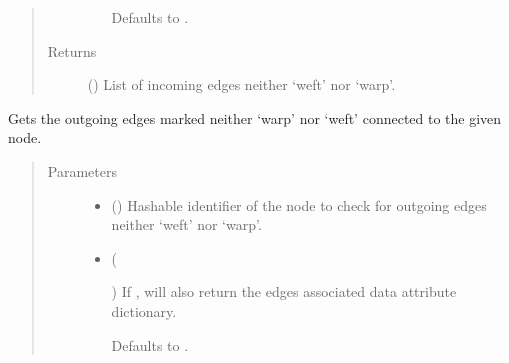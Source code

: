 \documentclass[letterpaper,10pt,english]{sphinxmanual}
\begin{document}
\begin{fulllineitems}
\begin{fulllineitems}
\begin{quote}
\begin{description}
\begin{itemize}
Defaults to .


\end{itemize}

\item[{Returns}] \leavevmode
{} () \textendash{} List of incoming edges neither ‘weft’ nor ‘warp’.

\end{description}\end{quote}

\end{fulllineitems}


\begin{fulllineitems}
\label{\detokenize{cockatoo:cockatoo.KnitDiNetwork.node_contour_edges_out}}
Gets the outgoing edges marked neither ‘warp’ nor ‘weft’ connected to
the given node.
\begin{quote}\begin{description}
\item[{Parameters}] \leavevmode\begin{itemize}
\item {} 
 () \textendash{} Hashable identifier of the node to check for outgoing edges neither
‘weft’ nor ‘warp’.

\item {} 
 (%
\begin{footnote}[148]\sphinxAtStartFootnote
{}
%
\end{footnote}\sphinxstyleliteralemphasis{\sphinxupquote{, }}) \textendash{} 
If , will also return the edges associated data attribute
dictionary.

Defaults to .


\end{itemize}


\end{description}
\end{quote}
\end{fulllineitems}
\end{fulllineitems}
\end{document}
